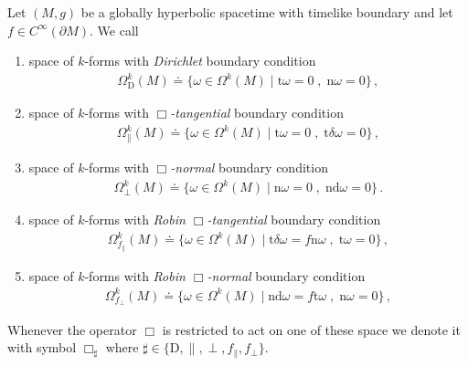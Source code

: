 \begin{Definition}\label{Def: Dirichlet, Box-tangential, Box-normal, Robin Box-tangential, Robin Box-normal boundary conditions}
	Let $(M,g)$ be a globally hyperbolic spacetime with timelike boundary and let $f\in C^\infty(\partial M)$.
	We call
	\begin{enumerate}
		\item space of $k$-forms with {\em Dirichlet} boundary condition
		\begin{align}\label{Eqn: Dirichlet k-forms}
		\Omega^k_{\mathrm{D}}(M)\doteq\{\omega\in\Omega^k(M)\;|\;\mathrm{t}\omega=0\;,\;\mathrm{n}\omega=0\}\,,
		\end{align}
		\item space of $k$-forms with {\em $\Box$-tangential} boundary condition
		\begin{align}\label{Eqn: Box-tangential k-forms}
		\Omega^k_\parallel(M)\doteq\{\omega\in\Omega^k(M)\;|\;\mathrm{t}\omega=0\;,\;\mathrm{t}\delta\omega=0\}\,,
		\end{align}
		\item space of $k$-forms with {\em $\Box$-normal} boundary condition
		\begin{align}\label{Eqn: Box-normal k-forms}
		\Omega^k_\perp(M)\doteq\{\omega\in\Omega^k(M)\;|\;\mathrm{n}\omega=0\;,\;\mathrm{nd}\omega=0\}\,.
		\end{align}
		\item space of $k$-forms with {\em Robin $\Box$-tangential} boundary condition
		\begin{align}\label{Eqn: Robin Box-tangential k-forms}
		\Omega^k_{f_\parallel}(M)\doteq\{\omega\in\Omega^k(M)\;|\;\mathrm{t}\delta\omega=f\mathrm{n}\omega\;,\;\mathrm{t}\omega=0\}\,,
		\end{align}
		\item space of $k$-forms with {\em Robin $\Box$-normal} boundary condition
		\begin{align}\label{Eqn: Robin Box-normal k-forms}
		\Omega^k_{f_\perp}(M)\doteq\{\omega\in\Omega^k(M)\;|\;\mathrm{nd}\omega=f\mathrm{t}\omega\;,\;\mathrm{n}\omega=0\}\,,
		\end{align}
	\end{enumerate}
	Whenever the operator $\Box$ is restricted to act on one of these space we denote it with symbol $\Box_\sharp$ where $\sharp\in\{\mathrm{D},\parallel,\perp,f_\parallel,f_\perp\}$.
\end{Definition}


